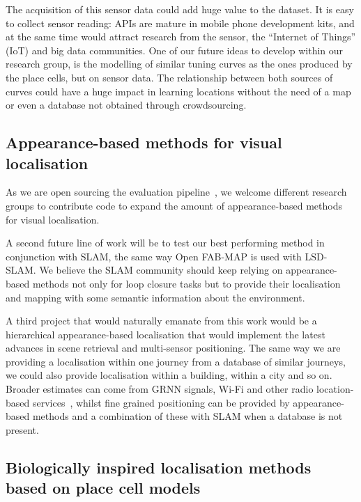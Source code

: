 The acquisition of this sensor data could add huge value to the dataset. It is easy to collect sensor reading: APIs are mature in mobile phone development kits, and at the same time would attract research from the sensor, the ``Internet of Things'' (IoT) and big data communities. One of our future ideas to develop within our research group, is the modelling of similar tuning curves as the ones produced by the place cells, but on sensor data. The relationship between both sources of curves could have a huge impact in learning locations without the need of a map or even a database not obtained through crowdsourcing.

\subsection{Appearance-based methods for visual localisation}
As we are open sourcing the evaluation pipeline~\cite{jose_rivera_rubio_2015_33762}, we welcome different research groups to contribute code to expand the amount of appearance-based methods for visual localisation.

A second future line of work will be to test our best performing method in conjunction with SLAM, the same way Open FAB-MAP is used with LSD-SLAM. We believe the SLAM community should keep relying on appearance-based methods not only for loop closure tasks but to provide their localisation and mapping with some semantic information about the environment.

A third project that would naturally emanate from this work would be a hierarchical appearance-based localisation that would implement the latest advances in scene retrieval and multi-sensor positioning. The same way we are providing a localisation within one journey from a database of similar journeys, we could also provide localisation within a building, within a city and so on. Broader estimates can come from GRNN signals, Wi-Fi and other radio location-based services~\cite{wang2012no}, whilst fine grained positioning can be provided by appearance-based methods and a combination of these with SLAM when a database is not present.

\subsection{Biologically inspired localisation methods based on place cell models}

